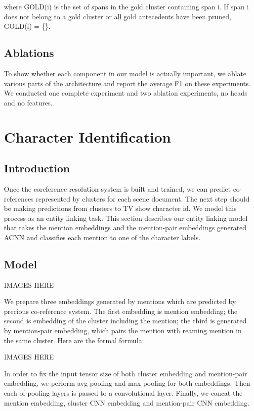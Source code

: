 \documentclass[11pt]{article}
\begin{document}
where GOLD(i) is the set of spans in the gold cluster containing span i. If span i does not belong to a gold cluster or all gold antecedents have been pruned, GOLD(i) = \{\}.

\subsection{Ablations}
To show whether each component in our model is actually important, we ablate various parts of the architecture and report the average F1 on these experiments. We conducted one complete experiment and two ablation experiments, no heads and no features.


\section{Character Identification}

\subsection{Introduction}
Once the coreference resolution system is built and trained, we can predict co-references represented by clusters for each scene document. The next step should be making predictions from clusters to TV show character id. We model this process as an entity linking task. This section describes our entity linking model that takes the mention embeddings and the mention-pair embeddings generated ACNN and classifies each mention to one of the character labels.

\subsection{Model}
IMAGES HERE

We prepare three embeddings generated by mentions which are predicted by precious co-reference system. The first embedding is mention embedding; the second is embedding of the cluster including the mention; the third is generated by mention-pair embedding, which pairs the mention with reaming mention in the same cluster. Here are the formal formula:

IMAGES HERE

In order to fix the input tensor size of both cluster embedding and mention-pair embedding, we perform avg-pooling and max-pooling for both embeddings. Then each of pooling layers is passed to a convolutional layer. Finally, we concat the mention embedding, cluster CNN embedding and mention-pair CNN embedding.
\end{document}
